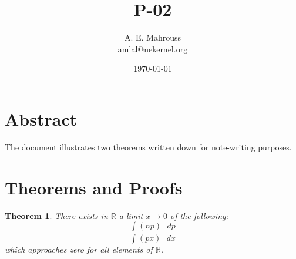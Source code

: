 \documentclass[10pt, twocolumn]{article}
\title{P-02}
\author{A. E. Mahrouss\\amlal@nekernel.org}
\date{\today}
\theoremstyle{plain}
\newtheorem{theorem}{Theorem}[section]
\theoremstyle{definition}
\theoremstyle{remark}
\begin{document}
\maketitle

\section{Abstract}

The document illustrates two theorems written down for note-writing purposes.

\section{Theorems and Proofs}
\begin{theorem}
    There exists in $\mathbb{R}$ a limit $x \to 0$ of the following:
    \begin{equation}
        \frac{\int (np) \text{ } dp}{\int (px) \text{ } dx}
    \end{equation}
    which approaches zero for all elements of $\mathbb{R}$.
\end{theorem}

\nocite{*}



\end{document}
